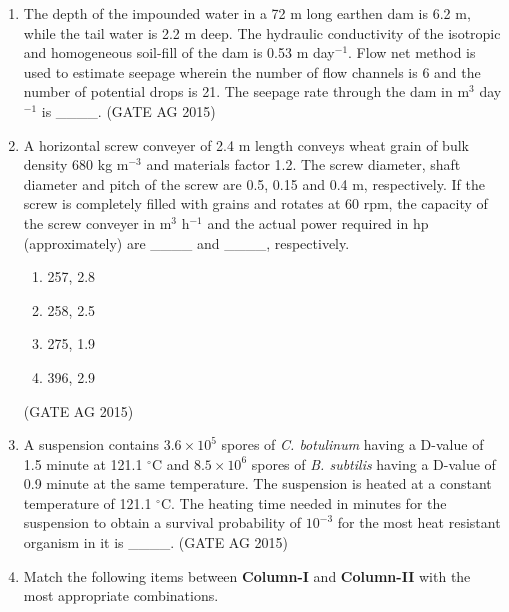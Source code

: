 \documentclass[journal,12pt,onecolumn]{IEEEtran}
\theoremstyle{remark}
\begin{document}
\begin{enumerate}
\item 
The depth of the impounded water in a 72 m long earthen dam is 6.2 m, while the tail water is 2.2 m deep. The hydraulic conductivity of the isotropic and homogeneous soil-fill of the dam is 0.53 m day$^{-1}$. Flow net method is used to estimate seepage wherein the number of flow channels is 6 and the number of potential drops is 21. The seepage rate through the dam in m$^{3}$ day$^{-1}$ is \_\_\_\_.
\hfill{(GATE AG 2015)}

\item 
A horizontal screw conveyer of 2.4 m length conveys wheat grain of bulk density 680 kg m$^{-3}$ and materials factor 1.2. The screw diameter, shaft diameter and pitch of the screw are 0.5, 0.15 and 0.4 m, respectively. If the screw is completely filled with grains and rotates at 60 rpm, the capacity of the screw conveyer in m$^{3}$ h$^{-1}$ and the actual power required in hp (approximately) are \_\_\_\_ and \_\_\_\_, respectively.
\begin{multicols}{4}
\begin{enumerate}
    \item 257, 2.8
    \item 258, 2.5
    \item 275, 1.9
    \item 396, 2.9
\end{enumerate}
\end{multicols}
\hfill{(GATE AG 2015)}

\item 
A suspension contains $3.6 \times 10^{5}$ spores of \textit{C. botulinum} having a D-value of 1.5 minute at 121.1 $^{\circ}$C and $8.5 \times 10^{6}$ spores of \textit{B. subtilis} having a D-value of 0.9 minute at the same temperature. The suspension is heated at a constant temperature of 121.1 $^{\circ}$C. The heating time needed in minutes for the suspension to obtain a survival probability of $10^{-3}$ for the most heat resistant organism in it is \_\_\_\_.
\hfill{(GATE AG 2015)}

\item 
Match the following items between \textbf{Column-I} and \textbf{Column-II} with the most appropriate combinations.  


\end{enumerate}
\end{document}

